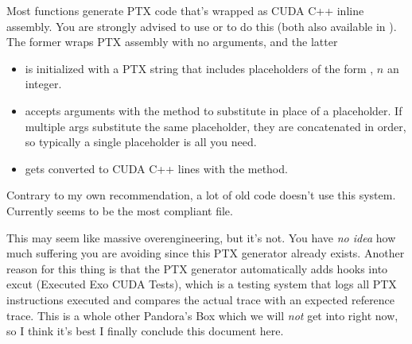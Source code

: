 Most  functions generate PTX code that's wrapped as CUDA C++ inline assembly.
You are strongly advised to use  or  to do this (both also available in ).
The former wraps PTX assembly with no arguments, and the latter
\begin{itemize}
  \item is initialized with a PTX string that includes placeholders of the form , $n$ an integer.
  \item accepts arguments with the  method to substitute in place of a placeholder.
    If multiple args substitute the same placeholder, they are concatenated in order, so typically a single placeholder  is all you need.
  \item gets converted to CUDA C++ lines with the  method.
\end{itemize}
Contrary to my own recommendation, a lot of old code doesn't use this system.
Currently  seems to be the most compliant file.

This may seem like massive overengineering, but it's not.
You have \emph{no idea} how much suffering you are avoiding since this PTX generator already exists.
Another reason for this thing is that the PTX generator automatically adds hooks into excut (Executed Exo CUDA Tests), which is a testing system that logs all PTX instructions executed and compares the actual trace with an expected reference trace.
This is a whole other Pandora's Box which we will \emph{not} get into right now, so I think it's best I finally conclude this document here.
